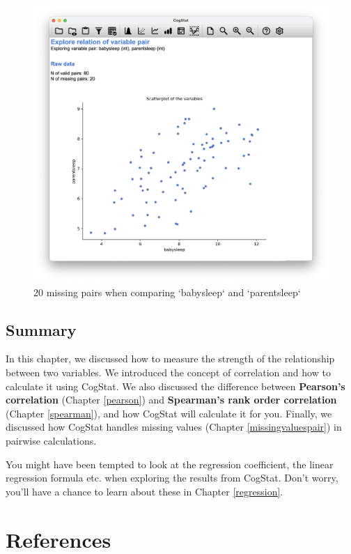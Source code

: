 \documentclass[
  11pt,
]{book}
\theoremstyle{definition}
\theoremstyle{definition}
\theoremstyle{definition}
\theoremstyle{definition}
\theoremstyle{remark}
\begin{document}
\begin{figure}

{\centering \includegraphics[width=0.66\linewidth]{resources/image/cogstatparentsleepbabysleepmissing} 

}

\caption{20 missing pairs when comparing `babysleep` and `parentsleep`}\label{fig:parenthoodmissingcog3}
\end{figure}

\hypertarget{summary-2}{%
\section*{Summary}\label{summary-2}}

In this chapter, we discussed how to measure the strength of the relationship between two variables. We introduced the concept of correlation and how to calculate it using CogStat. We also discussed the difference between \textbf{Pearson's correlation} (Chapter \ref{pearson}) and \textbf{Spearman's rank order correlation} (Chapter \ref{spearman}), and how CogStat will calculate it for you. Finally, we discussed how CogStat handles missing values (Chapter \ref{missingvaluespair}) in pairwise calculations.

You might have been tempted to look at the regression coefficient, the linear regression formula etc. when exploring the results from CogStat. Don't worry, you'll have a chance to learn about these in Chapter \ref{regression}.

\hypertarget{references}{%
\chapter*{References}\label{references}}
\end{document}
